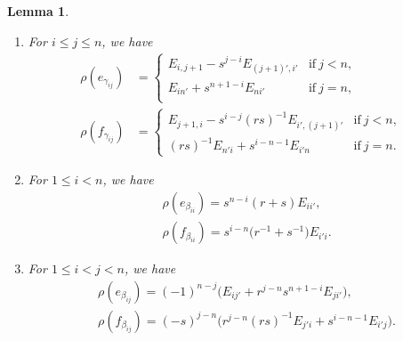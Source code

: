 \documentclass[pdftex]{sigma}
\numberwithin{equation}{section}
\newtheorem{Lemma}[Theorem]{Lemma}
\begin{document}
\begin{Lemma}\label{lem:C-allroots}\quad
\begin{enumerate}\itemsep=0pt
\item[$(a)$] For $i \le j \le n$, we have
\begin{displaymath}
\begin{split}
 \rho(e_{\gamma_{ij}}) &=
 \begin{cases}
 E_{i,j + 1} - s^{j - i}E_{(j + 1)',i'} & \text{if}\ j < n, \\
 E_{in'} + s^{n + 1 - i}E_{ni'} & \text{if}\ j = n,\\
 \end{cases} \\
 \rho(f_{\gamma_{ij}}) &=
 \begin{cases}
 E_{j + 1,i} - s^{i - j}(rs)^{-1}E_{i',(j+1)'} & \text{if}\ j < n ,\\
 (rs)^{-1}E_{n'i} + s^{i - n - 1}E_{i'n} & \text{if}\ j = n.
 \end{cases}
\end{split}
\end{displaymath}

\item[$(b)$] For $1 \le i < n$, we have
\begin{displaymath}
\begin{split}
 & \rho(e_{\beta_{ii}}) = s^{n-i}(r +s) E_{ii'}, \\
 & \rho(f_{\beta_{ii}}) = s^{i - n}\bigl(r^{-1} + s^{-1}\bigr)E_{i'i}.
\end{split}
\end{displaymath}

\item[$(c)$] For $1 \le i < j < n$, we have
\begin{displaymath}
\begin{split}
 & \rho(e_{\beta_{ij}}) = (-1)^{n-j}\bigl(E_{ij'} + r^{j-n}s^{n + 1 - i}E_{ji'}\bigr) , \\
 & \rho(f_{\beta_{ij}}) = (-s)^{j-n}\bigl(r^{j - n}(rs)^{-1}E_{j'i} + s^{i - n- 1}E_{i'j}\bigr) .
\end{split}
\end{displaymath}
\end{enumerate}
\end{Lemma}
\end{document}
